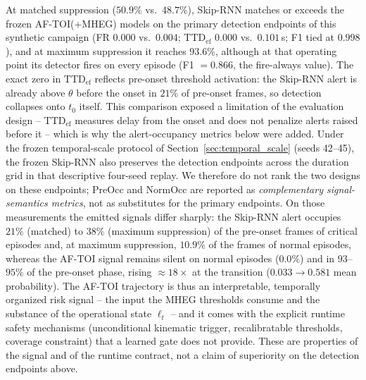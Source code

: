 \documentclass[a4paper,fleqn]{cas-dc}
\newcommand{\MHEG}{\mbox{MHEG}\xspace}
\begin{document}
{At matched suppression ($50.9\%$ vs.\ $48.7\%$), Skip-RNN matches or exceeds
the frozen \mbox{AF-TOI}(+\MHEG) models on the primary detection endpoints of
this synthetic campaign (FR $0.000$ vs.\ $0.004$; $\mathrm{TTD}_{\mathrm{ef}}$
$0.000$ vs.\ $0.101$\,s; F1 tied at $0.998$), and at maximum suppression it
reaches $93.6\%$, although at that operating point its detector fires on
every episode (F1 $=0.866$, the fire-always value). The exact zero in
$\mathrm{TTD}_{\mathrm{ef}}$ reflects pre-onset threshold activation: the
Skip-RNN alert is already above $\theta$ before the onset in $21\%$ of
pre-onset frames, so detection collapses onto $t_0$ itself. This comparison
exposed a limitation of the evaluation design -- $\mathrm{TTD}_{\mathrm{ef}}$
measures delay from the onset and does not penalize alerts raised before it
-- which is why the alert-occupancy metrics below were added. Under the
frozen temporal-scale protocol of Section~\ref{sec:temporal_scale} (seeds
42--45), the frozen Skip-RNN also preserves the detection endpoints across
the duration grid in that descriptive four-seed replay. We therefore do not rank the two designs on these
endpoints; PreOcc and NormOcc are reported as \emph{complementary
signal-semantics metrics}, not as
substitutes for the primary endpoints. On those measurements the emitted
signals differ sharply: the Skip-RNN alert occupies $21\%$ (matched) to
$38\%$ (maximum suppression) of the pre-onset frames of critical episodes
and, at maximum suppression, $10.9\%$ of the frames of normal episodes,
whereas the \mbox{AF-TOI} signal remains silent on normal episodes ($0.0\%$)
and in $93$--$95\%$ of the pre-onset phase, rising ${\approx}18\times$ at the
transition ($0.033 \rightarrow 0.581$ mean probability). The \mbox{AF-TOI}
trajectory is thus an interpretable, temporally organized risk signal -- the
input the \MHEG thresholds consume and the substance of the operational state
$\ell_t$ -- and it comes with the explicit runtime safety mechanisms
(unconditional kinematic trigger, recalibratable thresholds, coverage
constraint) that a learned gate does not provide. These are properties of the
signal and of the runtime contract, not a claim of superiority on the
detection endpoints above.

}
\end{document}
